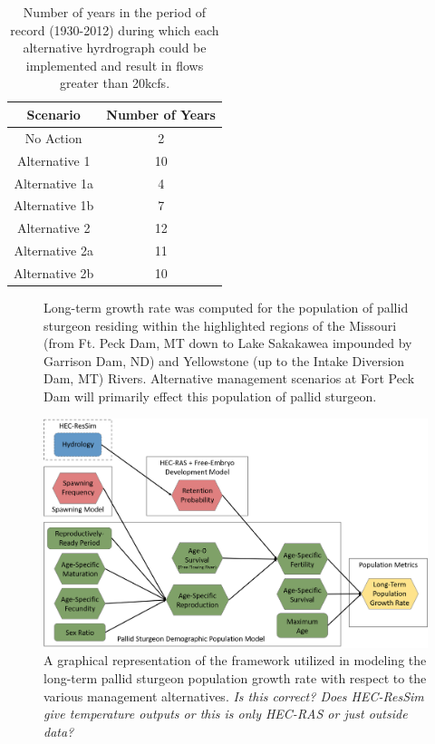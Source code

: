 \documentclass[12pt]{article}
\begin{document}
\newpage
\begin{table}[h]
\caption{Number of years in the period of record (1930-2012) during which each alternative hyrdrograph could be implemented and result in flows greater than 20kcfs.}
\centering
\begin{tabular}{cc}
\hline
Scenario & \hspace{12pt}Number of Years\hspace{12pt}\\
\hline
No Action & 2\\
Alternative 1 & 10\\
Alternative 1a & 4\\
Alternative 1b & 7\\
Alternative 2 & 12\\
Alternative 2a & 11\\
Alternative 2b & 10\\
\hline
\end{tabular}
\end{table}

\newpage

\begin{figure}[h]
\caption{Long-term growth rate was computed for the population of pallid sturgeon residing within the highlighted regions of the Missouri (from Ft. Peck Dam, MT down to Lake Sakakawea impounded by Garrison Dam, ND) and Yellowstone (up to the Intake Diversion Dam, MT) Rivers.  Alternative management scenarios at Fort Peck Dam will primarily effect this population of pallid sturgeon.}
\end{figure}

\newpage

\begin{figure}[h]
\centering
\includegraphics[width=6in]{NEPA_fig_2-model-framework}
\caption{A graphical representation of the framework utilized in modeling the long-term pallid sturgeon population growth rate with respect to the various management alternatives. \textit{Is this correct?  Does HEC-ResSim give temperature outputs or this is only HEC-RAS or just outside data?}}
\end{figure}
\end{document}
